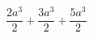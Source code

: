 \begin{ex}
	\begin{condition}
		\( \dfrac{2a^3}{2}+\dfrac{3a^3}{2}+\dfrac{5a^3}{2} \)
	\end{condition}
\end{ex}